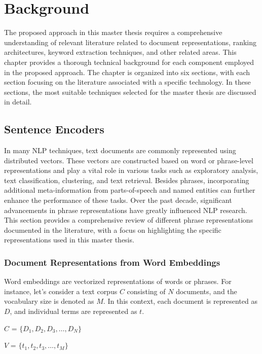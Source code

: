 
\chapter{Background}

The proposed approach in this master thesis requires a comprehensive understanding of relevant literature related to document representations, ranking architectures, keyword extraction techniques, and other related areas. This chapter provides a thorough technical background for each component employed in the proposed approach. The chapter is organized into six sections, with each section focusing on the literature associated with a specific technology. In these sections, the most suitable techniques selected for the master thesis are discussed in detail.

\section{Sentence Encoders}
In many \ac{NLP} techniques, text documents are commonly represented using distributed vectors. These vectors are constructed based on word or phrase-level representations and play a vital role in various tasks such as exploratory analysis, text classification, clustering, and text retrieval. Besides phrases, incorporating additional meta-information from parts-of-speech and named entities can further enhance the performance of these tasks. Over the past decade, significant advancements in phrase representations have greatly influenced \ac{NLP} research. This section provides a comprehensive review of different phrase representations documented in the literature, with a focus on highlighting the specific representations used in this master thesis.

\subsection{Document Representations from Word Embeddings}

Word embeddings are vectorized representations of words or phrases. For instance, let's consider a text corpus $C$ consisting of $N$ documents, and the vocabulary size is denoted as $M$. In this context, each document is represented as $D$, and individual terms are represented as $t$.

\centerline{$C$ = $\{D_1, D_2, D_3,\dots, D_N\}$ }
\centerline{$V$ = $\{t_1, t_2, t_3,\dots, t_M\}$ }


